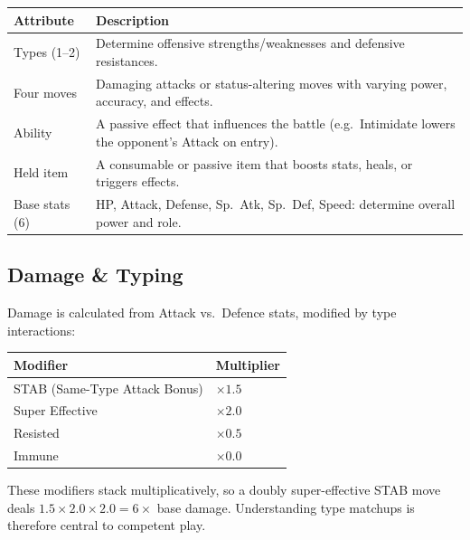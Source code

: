 \begin{center}
\small
\begin{tabularx}{\textwidth}{l X}
  \toprule
  \textbf{Attribute} & \textbf{Description} \\
  \midrule
  Types (1--2)        & Determine offensive strengths/weaknesses and
                        defensive resistances. \\
  Four moves          & Damaging attacks or status-altering moves with
                        varying power, accuracy, and effects. \\
  Ability             & A passive effect that influences the battle
                        (e.g.\ Intimidate lowers the opponent's Attack on
                        entry). \\
  Held item           & A consumable or passive item that boosts stats,
                        heals, or triggers effects. \\
  Base stats (6)      & HP, Attack, Defense, Sp.\ Atk, Sp.\ Def, Speed:
                        determine overall power and role. \\
  \bottomrule
\end{tabularx}
\end{center}

\subsection{Damage \& Typing}

Damage is calculated from Attack vs.\ Defence stats, modified by type
interactions:

\begin{center}
\small
\begin{tabularx}{0.8\textwidth}{l l}
  \toprule
  \textbf{Modifier} & \textbf{Multiplier} \\
  \midrule
  STAB (Same-Type Attack Bonus) & $\times 1.5$ \\
  Super Effective               & $\times 2.0$ \\
  Resisted                      & $\times 0.5$ \\
  Immune                        & $\times 0.0$ \\
  \bottomrule
\end{tabularx}
\end{center}

These modifiers stack multiplicatively, so a doubly super-effective STAB move
deals $1.5 \times 2.0 \times 2.0 = 6\times$ base damage.  Understanding type
matchups is therefore central to competent play.


